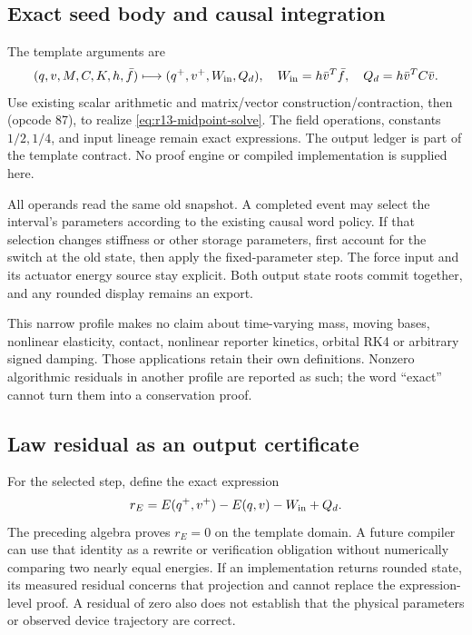 \subsection{Exact seed body and causal integration}
The template arguments are
\begin{equation}
 (q,v,M,C,K,h,\bar f)\longmapsto(q^+,v^+,W_{\rm in},Q_d),
 \quad W_{\rm in}=h\bar v^T\bar f,\quad Q_d=h\bar v^TC\bar v.
\end{equation}
Use existing scalar arithmetic and matrix/vector construction/contraction,
then  (opcode 87), to realize
\eqref{eq:r13-midpoint-solve}. The field operations, constants $1/2,1/4$,
and input lineage remain exact expressions. The output ledger is part of the
template contract. No proof engine or compiled implementation is supplied here.

All operands read the same old snapshot. A completed event may select the
interval's parameters according to the existing causal word policy. If that
selection changes stiffness or other storage parameters, first account for
the switch at the old state, then apply the fixed-parameter step. The force
input and its actuator energy source stay explicit. Both output state roots
commit together, and any rounded display remains an export.

This narrow profile makes no claim about time-varying mass, moving bases,
nonlinear elasticity, contact, nonlinear reporter kinetics, orbital RK4 or
arbitrary signed damping. Those applications retain their own definitions.
Nonzero algorithmic residuals in another profile are reported as such; the
word ``exact'' cannot turn them into a conservation proof.

\subsection{Law residual as an output certificate}
For the selected step, define the exact expression
\begin{equation}
 r_E=E(q^+,v^+)-E(q,v)-W_{\rm in}+Q_d.
\end{equation}
The preceding algebra proves $r_E=0$ on the template domain. A future compiler
can use that identity as a rewrite or verification obligation without
numerically comparing two nearly equal energies. If an implementation returns
rounded state, its measured residual concerns that projection and cannot
replace the expression-level proof. A residual of zero also does not establish
that the physical parameters or observed device trajectory are correct.
